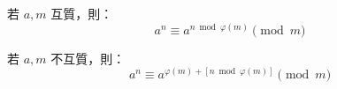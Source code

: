 \noindent
若 $a, m$ 互質，則：
$$a^n \equiv a^{n \bmod \varphi(m)} \pmod m$$

\noindent
若 $a, m$ 不互質，則：
$$a^n \equiv a^{\varphi(m) + [n\bmod \varphi(m)]} \pmod m$$